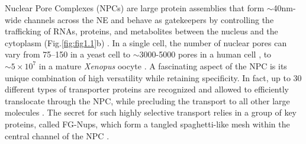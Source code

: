 Nuclear Pore Complexes (NPCs) are large protein assemblies that form $\sim$40nm-wide channels across the NE and behave as gatekeepers by controlling the trafficking of RNAs, proteins, and metabolites between the nucleus and the cytoplasm (Fig.\ref{fig:fig1.1}b) \cite{Wente2010}. In a single cell, the number of nuclear pores can vary  from 75–150 in a yeast cell \cite{Winey1997} to $\sim$3000-5000 pores in a human cell \cite{Gorlich1999}, to $\sim5\times 10^7$ in a mature \emph{Xenopus} oocyte \cite{Cordes1995}. A fascinating aspect of the NPC is its unique combination of high versatility while retaining specificity. In fact, up to 30 different types of transporter proteins are recognized and allowed to efficiently translocate through the NPC, while precluding the transport to all other large molecules \cite{Mackmull2017}. The secret for such highly selective transport relies in a group of key proteins, called FG-Nups, which form a tangled spaghetti-like mesh within the central channel of the NPC \cite{Wente2000}. 




